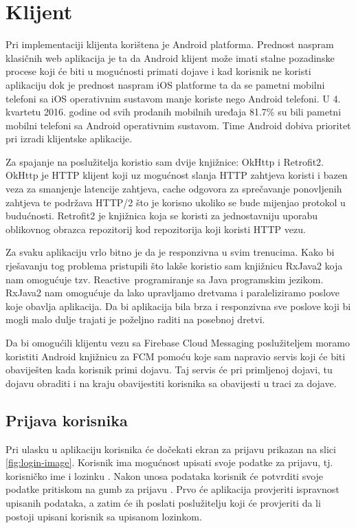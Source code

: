 \documentclass[times, utf8, zavrsni]{fer}
\begin{document}
{\section{Klijent}
Pri implementaciji klijenta korištena je Android platforma. Prednost naspram klasičnih web aplikacija je ta da Android klijent može imati stalne pozadinske procese koji će biti u mogućnosti primati dojave i kad korisnik ne koristi aplikaciju dok je prednost naspram iOS platforme ta da se pametni mobilni telefoni sa iOS operativnim sustavom manje koriste nego Android telefoni. U 4. kvartetu 2016. godine od svih prodanih mobilnih uređaja 81.7\% \citep{vincent2017} su bili pametni mobilni telefoni sa Android operativnim sustavom. Time Android dobiva prioritet pri izradi klijentske aplikacije.

Za spajanje na poslužitelja koristio sam dvije knjižnice: OkHttp i Retrofit2. OkHttp je HTTP klijent koji uz mogućnost slanja HTTP zahtjeva koristi i bazen veza za smanjenje latencije zahtjeva, cache odgovora za sprečavanje ponovljenih zahtjeva te podržava HTTP/2 što je korisno ukoliko se bude mijenjao protokol u budućnosti. Retrofit2 je knjižnica koja se koristi za jednostavniju uporabu oblikovnog obrazca repozitorij kod repozitorija koji koristi HTTP vezu.

Za svaku aplikaciju vrlo bitno je da je responzivna u svim trenucima. Kako bi rješavanju tog problema pristupili što lakše koristio sam knjižnicu RxJava2 koja nam omogućuje tzv. \glqq Reactive\grqq\  programiranje sa Java programskim jezikom. RxJava2 nam omogućuje da lako upravljamo dretvama i paraleliziramo poslove koje obavlja aplikacija. Da bi aplikacija bila brza i responzivna sve poslove koji bi mogli malo dulje trajati je poželjno raditi na posebnoj dretvi.

Da bi omogućili klijentu vezu sa Firebase Cloud Messaging poslužiteljem moramo koristiti Android knjižnicu za FCM pomoću koje sam napravio servis koji će biti obaviješten kada korisnik primi dojavu. Taj servis će pri primljenoj dojavi, tu dojavu obraditi i na kraju obavijestiti korisnika sa obavijesti u traci za dojave.

\subsection{Prijava korisnika}
Pri ulasku u aplikaciju korisnika će dočekati ekran za prijavu prikazan na slici \ref{fig:login-image}. Korisnik ima mogućnost upisati svoje podatke za prijavu, tj. korisničko ime  i lozinku . Nakon unosa podataka korisnik će potvrditi svoje podatke pritiskom na gumb za prijavu . Prvo će aplikacija provjeriti ispravnost upisanih podataka, a zatim će ih poslati poslužitelju koji će provjeriti da li postoji upisani korisnik sa upisanom lozinkom.

}
\end{document}
